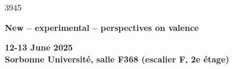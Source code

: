 \documentclass[a4paper,12pt]{article}
\makeatletter
\newcommand\HUGE{\@setfontsize\Huge{39}{45}}
\makeatother
\begin{document}
\thispagestyle{empty}



\noindent \HUGE
\begin{center}
\color{Blue}\textbf{New -- experimental -- perspectives on valence}
\end{center}


\normalsize 
\bigskip

\begin{center}
\Large 
\textbf{12-13 June 2025 \\ Sorbonne Université, salle F368 (escalier F, 2e étage)}
\end{center}

\bigskip
\end{document}
